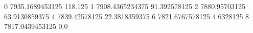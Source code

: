 0 7935.1689453125 118.125
1 7908.4365234375 91.392578125
2 7880.95703125 63.9130859375
4 7839.42578125 22.3818359375
6 7821.6767578125 4.6328125
8 7817.0439453125 0.0
